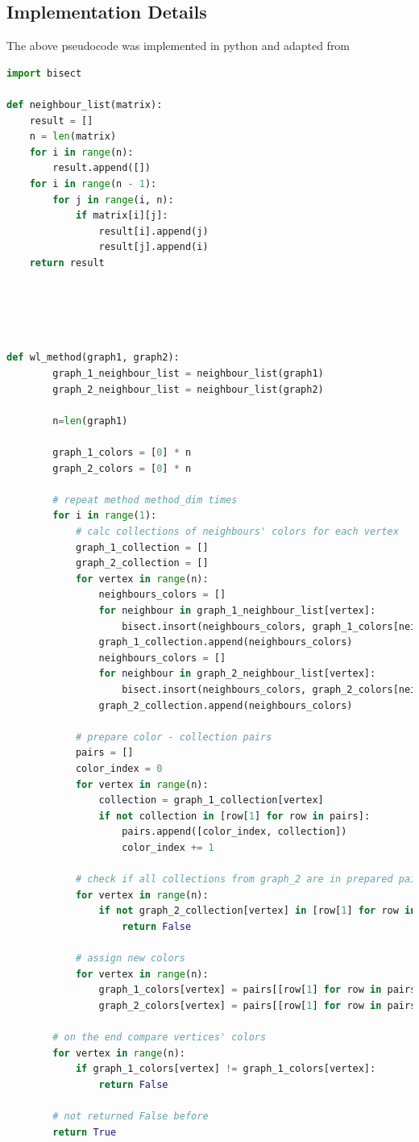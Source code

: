 \documentclass[11pt]{article}
\begin{document}
\subsection{Implementation Details}
The above pseudocode was implemented in python and adapted from \cite{wlTest}
\label{ssec:layout}
\begin{lstlisting}[language=Python]
import bisect

def neighbour_list(matrix):
    result = []
    n = len(matrix)
    for i in range(n):
        result.append([])
    for i in range(n - 1):
        for j in range(i, n):
            if matrix[i][j]:
                result[i].append(j)
                result[j].append(i)
    return result





def wl_method(graph1, graph2):
        graph_1_neighbour_list = neighbour_list(graph1)
        graph_2_neighbour_list = neighbour_list(graph2)

        n=len(graph1)

        graph_1_colors = [0] * n
        graph_2_colors = [0] * n

        # repeat method method_dim times
        for i in range(1):
            # calc collections of neighbours' colors for each vertex
            graph_1_collection = []
            graph_2_collection = []
            for vertex in range(n):
                neighbours_colors = []
                for neighbour in graph_1_neighbour_list[vertex]:
                    bisect.insort(neighbours_colors, graph_1_colors[neighbour])
                graph_1_collection.append(neighbours_colors)
                neighbours_colors = []
                for neighbour in graph_2_neighbour_list[vertex]:
                    bisect.insort(neighbours_colors, graph_2_colors[neighbour])
                graph_2_collection.append(neighbours_colors)

            # prepare color - collection pairs
            pairs = []
            color_index = 0
            for vertex in range(n):
                collection = graph_1_collection[vertex]
                if not collection in [row[1] for row in pairs]:
                    pairs.append([color_index, collection])
                    color_index += 1

            # check if all collections from graph_2 are in prepared pairs
            for vertex in range(n):
                if not graph_2_collection[vertex] in [row[1] for row in pairs]:
                    return False

            # assign new colors
            for vertex in range(n):
                graph_1_colors[vertex] = pairs[[row[1] for row in pairs].index(graph_1_collection[vertex])][0]
                graph_2_colors[vertex] = pairs[[row[1] for row in pairs].index(graph_2_collection[vertex])][0]

        # on the end compare vertices' colors
        for vertex in range(n):
            if graph_1_colors[vertex] != graph_1_colors[vertex]:
                return False

        # not returned False before
        return True
\end{lstlisting}
\end{document}

